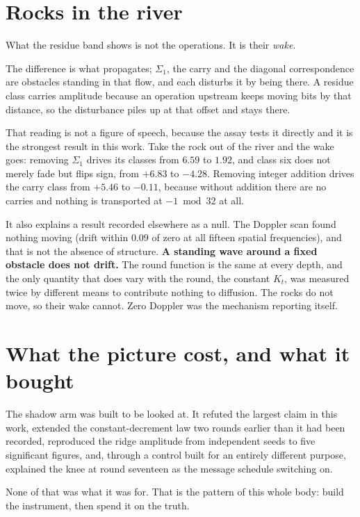 \section{Rocks in the river}

What the residue band shows is not the operations. It is their \emph{wake}.

The difference is what propagates; \(\Sigma_1\), the carry and the diagonal correspondence are
obstacles standing in that flow, and each disturbs it by being there. A residue class carries
amplitude because an operation upstream keeps moving bits by that distance, so the disturbance
piles up at that offset and stays there.

That reading is not a figure of speech, because the assay tests it directly and it is the strongest
result in this work. Take the rock out of the river and the wake goes: removing \(\Sigma_1\) drives
its classes from \(6.59\) to \(1.92\), and class six does not merely fade but flips sign, from
\(+6.83\) to \(-4.28\). Removing integer addition drives the carry class from \(+5.46\) to
\(-0.11\), because without addition there are no carries and nothing is transported at
\(-1 \bmod 32\) at all.

It also explains a result recorded elsewhere as a null. The Doppler scan found nothing moving
(drift within \(0.09\) of zero at all fifteen spatial frequencies), and that is not the absence of
structure. \textbf{A standing wave around a fixed obstacle does not drift.} The round function is
the same at every depth, and the only quantity that does vary with the round, the constant \(K_t\), was
measured twice by different means to contribute nothing to diffusion. The rocks do not move, so
their wake cannot. Zero Doppler was the mechanism reporting itself.

\section{What the picture cost, and what it bought}

The shadow arm was built to be looked at. It refuted the largest claim in this work, extended the
constant-decrement law two rounds earlier than it had been recorded, reproduced the ridge amplitude
from independent seeds to five significant figures, and, through a control built for an entirely
different purpose, explained the knee at round seventeen as the message schedule switching on.

None of that was what it was for. That is the pattern of this whole body: build the instrument,
then spend it on the truth.
